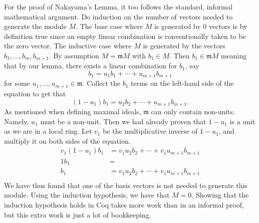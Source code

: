 \documentclass{article}
\begin{document}
For the proof of Nakayama's Lemma, it too follows the standard, informal
mathematical argument. Do induction on the number of vectors needed to generate
the module \(M\). The base case where \(M\) is generated by 0 vectors is by
definition true since an empty linear combination is conventionally taken to be
the zero vector. The inductive case where \(M\) is generated by the vectors
\(b_{1}, \dots, b_{m}, b_{m+1}\). By assumption \(M = \mathfrak{m} M\) with
\(b_{1}\in M\). Then \(b_{1}\in\mathfrak{m} M\) meaning that by our lemma,
there exists a linear combination for \(b_{1}\), say
\[b_{1} = u_{1} b_{1} + \cdots + u_{m+1} b_{m+1}\]
for some \(u_{1}, \dots, u_{m+1}\in\mathfrak{m}\). Collect the \(b_{1}\) terms
on the left-hand side of the equation to get that
\[(1 - u_{1}) b_{1} = u_{2} b_{2} + \cdots + u_{m+1} b_{m+1}\text{.}\]
As mentioned when defining maximal ideals, \(\mathfrak{m}\) can only contain
non-units. Namely, \(u_{1}\) must be a non-unit. Then we had already proven
that \(1 - u_{1}\) is a unit as we are in a local ring. Let \(v_{1}\) be the
multiplicative inverse of \(1 - u_{1}\), and multiply it on both sides of the
equation.
\begin{align*}
  v_{1} (1 - u_{1}) b_{1}
    & = v_{1} u_{2} b_{2} + \cdots + v_{1} u_{m+1} b_{m+1} \\
  1 b_{1} & = \\
  b_{1} & = v_{1} u_{2} b_{2} + \cdots + v_{1} u_{m+1} b_{m+1} \\
\end{align*}
We have thus found that one of the basis vectors is not needed to generate this
module. Using the induction hypothesis, we have that \(M = 0\). Showing that
the induction hypothesis holds in Coq takes more work than in an informal
proof, but this extra work is just a lot of bookkeeping.



\end{document}
